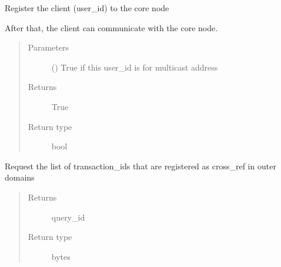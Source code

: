 \documentclass[letterpaper,10pt,english]{sphinxmanual}
\begin{document}
\begin{fulllineitems}
\begin{fulllineitems}
\begin{quote}
\begin{description}
\end{description}\end{quote}

\end{fulllineitems}


\begin{fulllineitems}
\label{\detokenize{bbc1.core.bbc_app:bbc1.core.bbc_app.BBcAppClient.register_to_core}}
Register the client (user\_id) to the core node

After that, the client can communicate with the core node.
\begin{quote}\begin{description}
\item[{Parameters}] \leavevmode
{} () \textendash{} True if this user\_id is for multicast address

\item[{Returns}] \leavevmode
True

\item[{Return type}] \leavevmode
bool

\end{description}\end{quote}

\end{fulllineitems}


\begin{fulllineitems}
\label{\detokenize{bbc1.core.bbc_app:bbc1.core.bbc_app.BBcAppClient.request_cross_ref_holders_list}}
Request the list of transaction\_ids that are registered as cross\_ref in outer domains
\begin{quote}\begin{description}
\item[{Returns}] \leavevmode
query\_id

\item[{Return type}] \leavevmode
bytes

\end{description}\end{quote}


\end{fulllineitems}
\end{fulllineitems}
\end{document}

